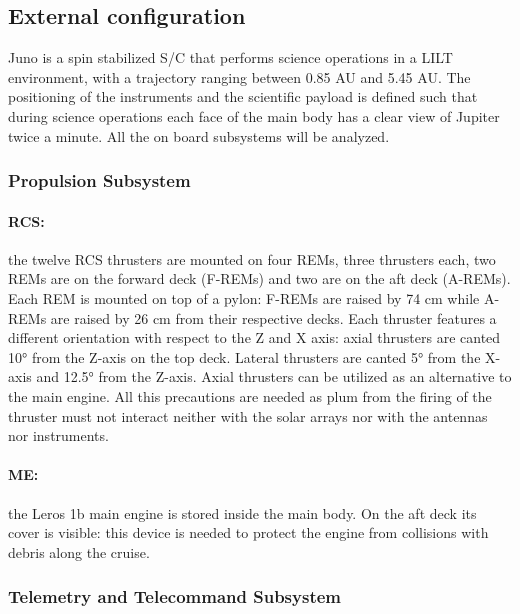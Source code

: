 \subsection{External configuration}
\label{subsec:external_config}

Juno is a spin stabilized S/C that performs science operations in a LILT environment, with a trajectory ranging between 0.85 AU and 5.45 AU. The positioning of the instruments and the scientific payload is defined such that during science operations each face of the main body has a clear view of Jupiter twice a minute. All the on board subsystems will be analyzed. 

\subsubsection{Propulsion Subsystem}
\label{subsubsec:prop_sub}

\paragraph{RCS:}the twelve RCS thrusters are mounted on four REMs, three thrusters each, two REMs are on the forward deck (F-REMs) and two are on the aft deck (A-REMs).
Each REM is mounted on top of a pylon: F-REMs are raised by 74 cm while A-REMs are raised by 26 cm from their respective decks.
Each thruster features a different orientation with respect to the Z and X axis: axial thrusters are canted 10° from the Z-axis on the top deck.
Lateral thrusters are canted 5° from the X-axis and 12.5° from the Z-axis. Axial thrusters can be utilized as an alternative to the main engine.  
\cite{juno_inner}
All this precautions are needed as plum from the firing of the thruster must not interact neither with the solar arrays nor with the antennas nor instruments.

\vspace{-4mm}

\paragraph{ME:}the Leros 1b main engine is stored inside the main body. On the aft deck its cover is visible: this device is needed to protect the engine from collisions with debris along the cruise. 

\subsubsection{Telemetry and Telecommand Subsystem}
\label{subsubsec:tmtc_sub}

